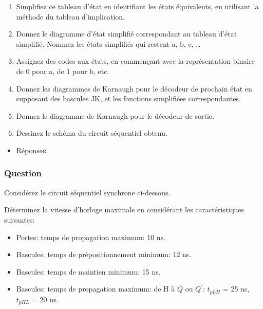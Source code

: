 \documentclass[11pt]{article}
\begin{document}
\begin{enumerate}
\item Simplifiez ce tableau d'état en identifiant les états
équivalents, en utilisant la méthode du tableau d'implication.

\item Donnez le diagramme d'état simplifié correspondant au tableau
d'état simplifié. Nommez les états simplifiés qui restent a,
b, c, \dots{}

\item Assignez des codes aux états, en commençant avec la
représentation binaire de 0 pour a, de 1 pour b, etc.

\item Donnez les diagrammes de Karnaugh pour le décodeur de prochain
état en supposant des bascules JK, et les fonctions simplifiées
correspondantes.

\item Donnez le diagramme de Karnaugh pour le décodeur de sortie.

\item Dessinez le schéma du circuit séquentiel obtenu.
\end{enumerate}

\begin{itemize}
\item Réponse\hfill{}\textsc{r}
\label{sec:orgc8c2e46}
\end{itemize}

\subsubsection*{Question}
\label{sec:org83d5e85}
Considérez le circuit séquentiel synchrone ci-dessous.
\begin{center}

\end{center}

Déterminez la vitesse d'horloge maximale en considérant les
caractéristiques suivantes:

\begin{itemize}
\item Portes: temps de propagation maximum: 10 ns.

\item Bascules: temps de prépositionnement minimum: 12 ns.

\item Bascules: temps de maintien minimum: 15 ns.

\item Bascules: temps de propagation maximum: de H à \(Q\) ou
\(Q^{\prime}\): \(t_{pLH}\) = 25 ns, \(t_{pHL}\) = 20 ns.
\end{itemize}
\end{document}
